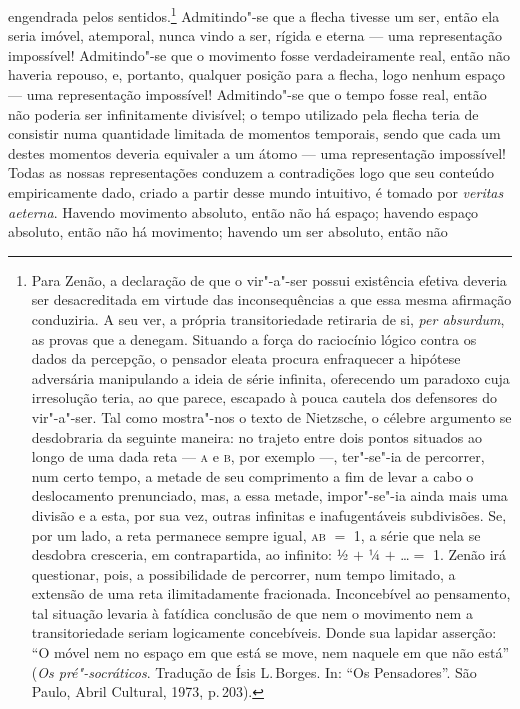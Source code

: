 engendrada pelos sentidos.\footnote{Para Zenão, a declaração de que 
o vir"-a"-ser possui existência efetiva deveria ser desacreditada em virtude 
das inconsequências a que essa mesma afirmação conduziria. A seu ver, 
a própria transitoriedade retiraria de si, \textit{per absurdum}, 
as provas que a denegam. Situando a força do raciocínio lógico contra os dados 
da percepção, o pensador eleata procura enfraquecer a
hipótese adversária manipulando a ideia de série infinita, oferecendo um
paradoxo cuja irresolução teria, ao que parece, escapado à pouca cautela dos
defensores do vir"-a"-ser. Tal como mostra"-nos o texto de Nietzsche, o
célebre argumento se desdobraria da seguinte maneira: no trajeto entre dois
pontos situados ao longo de uma dada reta --- \textsc{a} e \textsc{b}, por
exemplo ---, ter"-se"-ia de percorrer, num certo tempo, a metade de seu
comprimento a fim de levar a cabo o deslocamento prenunciado, mas, a essa
metade, impor"-se"-ia ainda mais uma divisão e a esta, por sua vez, outras
infinitas e inafugentáveis subdivisões. Se, por um lado, a reta permanece
sempre igual, \textsc{ab} $=$ 1, a série que nela se desdobra cresceria, em
contrapartida, ao infinito: ½ $+$ ¼ $+$ \ldots $=$ 1. Zenão irá questionar,
pois, a possibilidade de percorrer, num tempo limitado, a extensão de uma
reta ilimitadamente fracionada. Inconcebível ao pensamento, tal situação
levaria à fatídica conclusão de que nem o movimento nem a transitoriedade
seriam logicamente concebíveis. Donde sua lapidar asserção: ``O móvel nem no
espaço em que está se move, nem naquele em que não está'' (\textit{Os pré"-socráticos}. 
Tradução de Ísis L.\,Borges. In: ``Os Pensadores''. São Paulo, Abril 
Cultural, 1973, p.\,203).} Admitindo"-se que a flecha tivesse um ser, então ela 
seria imóvel, atemporal, nunca vindo a ser, rígida e eterna ---
uma representação impossível! Admitindo"-se que o movimento fosse
verdadeiramente real, então não haveria repouso, e, portanto, qualquer
posição para a flecha, logo nenhum espaço --- uma representação impossível!
Admitindo"-se que o tempo fosse real, então não poderia ser infinitamente
divisível; o tempo utilizado pela flecha teria de consistir numa quantidade
limitada de momentos temporais, sendo que cada um destes momentos deveria
equivaler a um átomo --- uma representação impossível! Todas as nossas
representações conduzem a contradições logo que seu conteúdo empiricamente
dado, criado a partir desse mundo intuitivo, é tomado por \textit{veritas aeterna}. 
Havendo movimento absoluto, então não há espaço; havendo
espaço absoluto, então não há movimento; havendo um ser absoluto, então não
